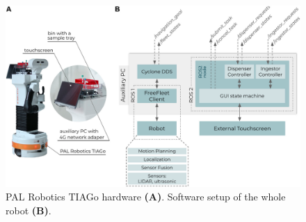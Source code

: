 \begin{figure}[H]
    \centering
    \includegraphics[width=4.5in]{pics/rmf2.png}
    \caption[PAL Robotics TIAGo hardware \textbf{(A)}. Software setup of the whole robot \textbf{(B)}.]{PAL Robotics TIAGo hardware \textbf{(A)}. Software setup of the whole robot \textbf{(B)}.~\cite{valner2022scalable}}\label{stm32_pi}
\end{figure}





